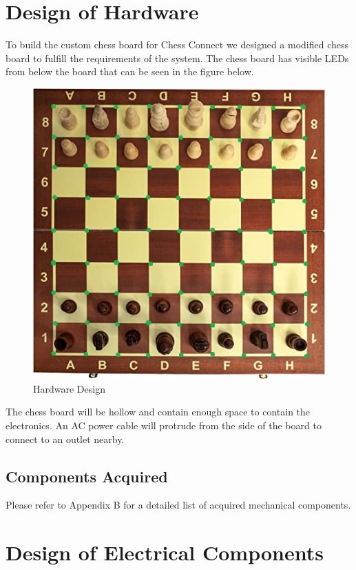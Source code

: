 \documentclass[12pt, titlepage]{article}
\begin{document}
\section{Design of Hardware}
To build the custom chess board for Chess Connect we designed a modified chess 
board to fulfill the requirements of the system. The chess board has visible 
LEDs from below the board that can be seen in the figure below. 
\begin{figure}[H]
  \begin{center}
    \includegraphics[scale=0.75]{chess_board.jpg}
    \caption{Hardware Design}
    \label{Fig_Hardware_Design} 
  \end{center}
\end{figure}
The chess board will be hollow and contain enough space to contain the 
electronics. An AC power cable will protrude from the side of the board to 
connect to an outlet nearby. 




\subsection{Components Acquired}
Please refer to Appendix B for a detailed list of acquired mechanical components.

\section{Design of Electrical Components}
\end{document}
